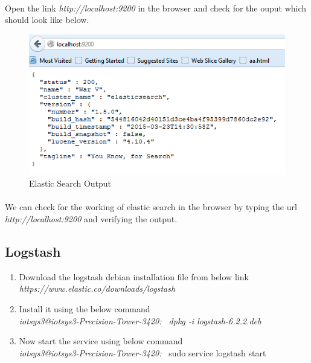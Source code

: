 \documentclass{report}
\begin{document}
\paragraph{}
Open the link \textit{http://localhost:9200} in the browser and check for the ouput which should look like below.

\begin{figure}[H]
\centering
\caption{Elastic Search Output}
\includegraphics[scale=0.7]{Elastic_Search_Installation}
\end{figure}

\paragraph{}
We can check for the working of elastic search in the browser by typing the url \textit{http://localhost:9200} and verifying the output.

\subsection{Logstash}

\begin{enumerate}
\item Download the logstash debian installation file from below link\\
\textit{https://www.elastic.co/downloads/logstash}
\item Install it using the below command \\
\textit {{\color{blue}iotsys3@iotsys3-Precision-Tower-3420:~} dpkg -i logstash-6.2.2.deb}
\item Now start the service using below command\\
\textit{\color{blue}iotsys3@iotsys3-Precision-Tower-3420:~} sudo service logstash start
\end{enumerate}
\end{document}
